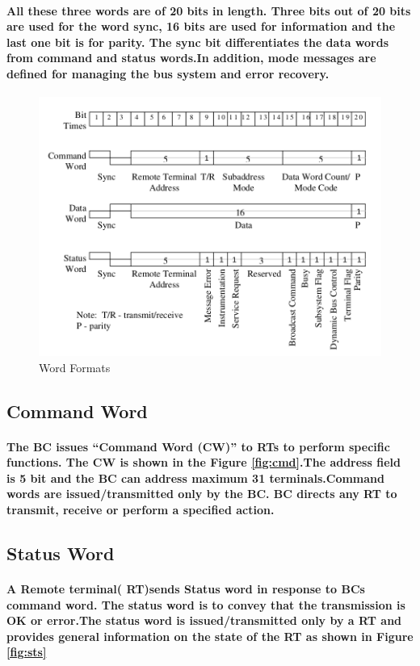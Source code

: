 \documentclass[12pt,a4paper]{report}
\begin{document}
\paragraph{\textrm{\textmd {All these three words are of 20 bits in length. Three bits out of 20 bits are used for the word sync, 16 bits are used for information and the last one bit is for parity. The sync bit differentiates the data words from command and status words.In addition, mode messages are defined for managing the bus system and error recovery.}}}
\begin{figure}[h]
	\centering
	\includegraphics[scale=.35]{word.png}
	\caption{Word Formats}
	\label{fig:ifstage}
\end{figure}
\subsection{Command Word}
\paragraph{\textrm{\textmd{ The BC issues “Command Word (CW)” to RTs to perform specific functions. The CW is shown in the Figure \ref{fig:cmd}.The address field is 5 bit and the BC can address maximum 31 terminals.Command words are issued/transmitted only by the BC. BC directs any RT to transmit, receive or perform a specified action.}}}
\subsection{Status Word}
\paragraph{\textrm{\textmd{A Remote terminal( RT)sends Status word in response to BCs command word. The status word is to convey that the transmission is OK or error.The status word is issued/transmitted only by a RT and provides general information on the state of the RT as shown in Figure \ref{fig:sts} }}}
\end{document}
